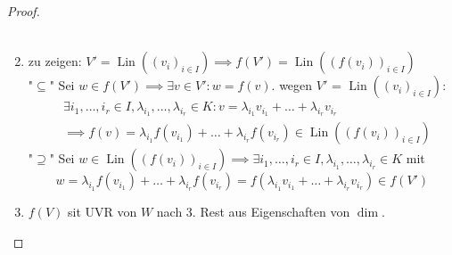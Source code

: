 \documentclass[a4paper]{scrartcl}
\DeclareMathOperator{\Exists}{\exists}
\DeclareMathOperator{\Lin}{Lin}
\theoremstyle{definition}
\theoremstyle{plain}
\theoremstyle{plain}
\theoremstyle{remark}
\theoremstyle{remark}
\theoremstyle{remark}
\theoremstyle{remark}
\theoremstyle{remark}
\begin{document}
\begin{proof}
\begin{enumerate}
\begin{align*}
\end{align*}
\item zu zeigen: $V' = \Lin((v_i)_{i\in I}) \implies f(V') = \Lin((f(v_i))_{i\in I})$ \\
         "$\subseteq$" Sei $w \in f(V') \implies \Exists v\in V': w = f(v)$. wegen $V'$ = $\Lin((v_i)_{i\in I})$:
\begin{align*}
&\Exists i_1, \ldots, i_r \in I, \lambda_{i_1}, \ldots, \lambda_{i_r} \in K: v = \lambda_{i_1} v_{i_1} + \ldots + \lambda_{i_r} v_{i_r} \\
&\implies f(v) = \lambda_{i_1} f(v_{i_1}) + \ldots + \lambda_{i_r} f(v_{i_r}) \in \Lin((f(v_i))_{i\in I})
\end{align*}
"$\supseteq$" Sei $w\in \Lin((f(v_i))_{i\in I}) \implies \Exists i_1, \ldots, i_r \in I, \lambda_{i_1}, \ldots, \lambda_{i_r} \in K$ mit
\[w = \lambda_{i_1} f(v_{i_1}) + \ldots + \lambda_{i_r} f(v_{i_r}) = f(\lambda_{i_1} v_{i_1} + \ldots + \lambda_{i_r} v_{i_r}) \in f(V')\]
\item $f(V)$ sit UVR von $W$ nach 3. Rest aus Eigenschaften von $\dim$.
\end{enumerate}
\end{proof}
\end{document}
